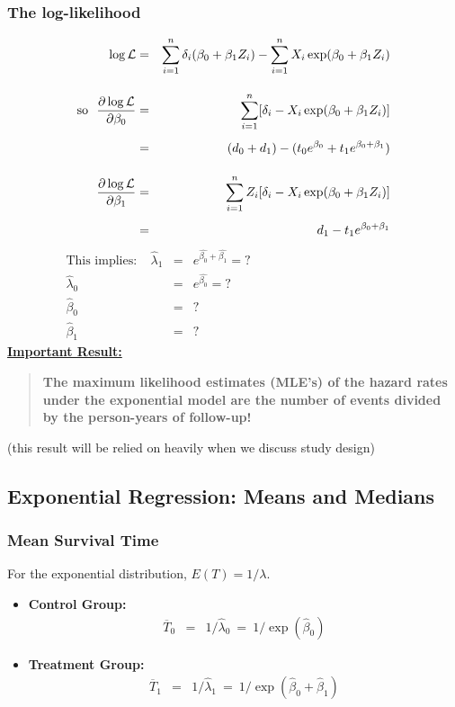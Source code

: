 \documentclass[11pt,psfig]{book}
\begin{document}
\subsubsection{The log-likelihood}
\begin{eqnarray*}
\log {\cal L} & = &  \sum_{i=1}^{n} {\delta_i} (\beta_0 + \beta_1 Z_i) -
\sum_{i=1}^{n} X_i\exp(\beta_0 + \beta_1 Z_i)\\[2.5ex]
\mbox{so} ~~\frac{\partial\log{\cal L}  }{\partial \beta_0}
    & =  &  \sum_{i=1}^{n}  [ \delta_i -
   X_i \exp( \beta_0 + \beta_1 Z_{i} )]  \\[1ex]
   & =  & (d_0 + d_1) - (t_0 e^{\beta_0} + t_1 e^{\beta_0+\beta_1}) \\[2.5ex]
\frac{\partial\log{\cal L}  }{\partial \beta_1}
    & =  &  \sum_{i=1}^{n}  Z_i[ {\delta_i} -
   X_i \exp( \beta_0 + \beta_1 Z_{i} )]  \\[1ex]
   & =  &  d_1 -  t_1 e^{\beta_0+\beta_1}
\end{eqnarray*}
\begin{eqnarray*}
\mbox{This implies:}~~~~~ \hat\lambda_1 & =
& e^{\hat{\beta_0} + \hat{\beta_1}} = ? \hspace{2in} \\[1.5ex]
\hat\lambda_0 & = & e^{\hat{\beta_0}} = ?\\[1.5ex]
\hat\beta_0 & = & ?\\[1.5ex]
\hat\beta_1 & = & ?
\end{eqnarray*}
\underline{\bf Important Result:}\\[1ex]
\begin{quote}
{\bf The maximum likelihood estimates (MLE's) of the hazard rates
under the exponential model are the number of events divided by
the person-years of follow-up!}
\end{quote}
(this result will be relied on heavily when we discuss study design)
\subsection{Exponential Regression: Means and Medians}
\subsubsection{Mean Survival Time}
For the exponential distribution, $E(T)=1/\lambda$.
\begin{itemize}
\item {\bf Control Group:}
\begin{eqnarray*}
\overline{T}_0 & = & 1/\hat\lambda_0 ~=~ 1/\exp(\hat\beta_0)
\end{eqnarray*}
\item {\bf Treatment Group:}
\begin{eqnarray*}
\overline{T}_1 & = & 1/\hat\lambda_1 ~=~ 1/\exp(\hat\beta_0 + \hat\beta_1)
\end{eqnarray*}
\end{itemize}
\end{document}
